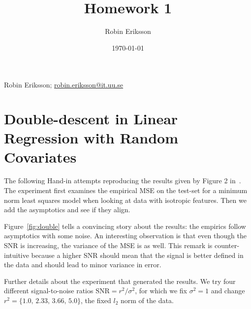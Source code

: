 \documentclass{amsart}
\numberwithin{equation}{section}
\numberwithin{table}{section}
\numberwithin{figure}{section}
\theoremstyle{plain}
\theoremstyle{definition}
\theoremstyle{remark}
\begin{document}
\title[]{Homework 1}

\author[R. Eriksson]{Robin Eriksson}



\date{\today}


Robin Eriksson; \href{mailto:robin.eriksson@it.uu.se}{robin.eriksson@it.uu.se}
\section{Double-descent in Linear Regression with Random Covariates}
The following Hand-in attempts reproducing the results given by Figure
2 in~\cite{hastie2019surprises}. The experiment first examines the
empirical MSE on the test-set for a minimum norm least squares model
when looking at data with isotropic features. Then we add the
asymptotics and see if they align.

Figure~\ref{fig:double} tells a convincing story about the results:
the empirics follow asymptotics with some noise. An interesting
observation is that even though the SNR is increasing, the variance of
the MSE is as well. This remark is counter-intuitive because a higher
SNR should mean that the signal is better defined in the data and
should lead to minor variance in error.

Further details about the experiment that generated the results. We
try four different signal-to-noise ratios $\text{SNR} = r^2/\sigma^2$,
for which we fix $\sigma^2=1$ and change
$r^2 = \{1.0,\, 2.33,\, 3.66,\, 5.0\}$, the fixed $l_2$ norm of the
data.
\end{document}
